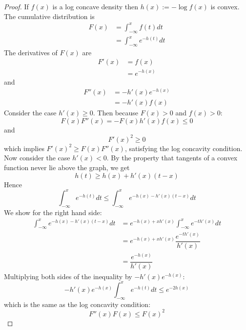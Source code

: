 \documentclass[11pt]{report} %
\begin{document}
\begin{proof}
If $f\left(x\right)$ is a log concave density then $h\left(x\right) := -\log f\left(x\right)$ is convex. The cumulative distribution is
\begin{align}
F\left(x\right) &= \int_{-\infty}^{x}f\left(t\right)dt \\
&= \int_{-\infty}^{x}e^{-h\left(t\right)}dt
\end{align}
The derivatives of $F\left(x\right)$ are
\begin{align}
F'\left(x\right) &= f\left(x\right) \\
&= e^{-h\left(x\right)}
\end{align}
and
\begin{align}
F''\left(x\right) &= -h'\left(x\right)e^{-h\left(x\right)} \\
&= -h'\left(x\right)f\left(x\right)
\end{align}
Consider the case $h'\left(x\right) \geq 0$. Then because $F\left(x\right) > 0$ and $f\left(x\right) > 0$:
\begin{equation}
F\left(x\right)F''\left(x\right) = -F\left(x\right)h'\left(x\right)f\left(x\right) \leq 0
\end{equation}
and
\begin{equation}
F'\left(x\right)^{2} \geq 0
\end{equation}
which implies $F'\left(x\right)^{2} \geq F\left(x\right)F''\left(x\right)$, satisfying the log concavity condition. Now consider the case $h'\left(x\right) < 0$. By the property that tangents of a convex function never lie above the graph, we get
\begin{equation}
h\left(t\right) \geq h\left(x\right) + h'\left(x\right)\left(t - x\right)
\end{equation}
Hence
\begin{equation}
\int_{-\infty}^{x}e^{-h\left(t\right)}dt \leq \int_{-\infty}^{x}e^{-h\left(x\right) - h'\left(x\right)\left(t - x\right)
}dt
\end{equation}
We show for the right hand side:
\begin{align}
\int_{-\infty}^{x}e^{-h\left(x\right) - h'\left(x\right)\left(t - x\right)
}dt &= e^{-h\left(x\right) + xh'\left(x\right)}\int_{-\infty}^{x}e^{-th'\left(x\right)}dt \\
&= e^{-h\left(x\right) + xh'\left(x\right)}\dfrac{e^{-th'\left(x\right)}}{h'\left(x\right)} \\
&= \dfrac{e^{-h\left(x\right)}}{h'\left(x\right)}
\end{align}
Multiplying both sides of the inequality by $-h'\left(x\right)e^{-h\left(x\right)}$:
\begin{equation}
-h'\left(x\right)e^{-h\left(x\right)}\int_{-\infty}^{x}e^{-h\left(t\right)}dt \leq e^{-2h\left(x\right)}
\end{equation}
which is the same as the log concavity condition:
\begin{equation}
F''\left(x\right)F\left(x\right) \leq F\left(x\right)^{2}
\end{equation}
\end{proof}
\end{document}
